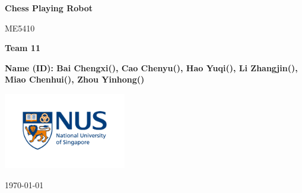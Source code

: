 \documentclass[10pt, a4paper, twocolumn]{article}
\newcommand\course{Materials, Sensors, Actuators & Fabrication in Robotics}
\newcommand\hwnumber{ME5410}
\newcommand\teamnumber{Team 11}
\newcommand\Information{Name (ID): Bai Chengxi(), Cao Chenyu(), Hao Yuqi(), Li Zhangjin(), Miao Chenhui(), Zhou Yinhong()}                        %
\begin{document}
\begin{titlepage}
    \begin{center}
        \vspace*{3cm}
            
        \Huge
        \textbf{Chess Playing Robot}
            
        \vspace{1cm}
        \huge
        \hwnumber
            
        \vspace{1.5cm}
        \Large

        \textbf{\teamnumber}
        
        \vspace{1.5cm}
        \Large
        
        \textbf{\Information}                      %
        
            
        \vfill
        
            
        \vspace{1cm}
            
        \includegraphics[width=0.4\textwidth]{logo-nus.png}
        \\
        
        \Large
        
        \today
            
    \end{center}
\end{titlepage}
\end{document}
